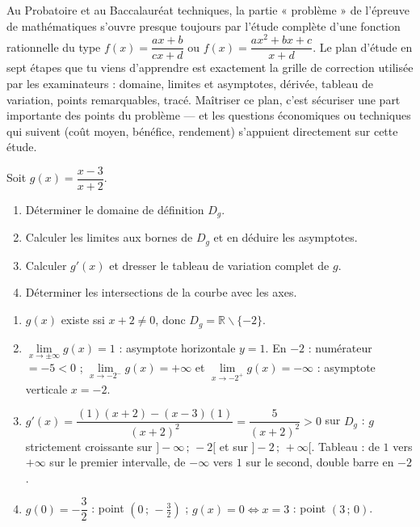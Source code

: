 \documentclass[11pt]{article}
\def\setminus{\mathbin{\backslash}}\let\smallsetminus\setminus
\begin{document}
\begin{savaistu}
Au Probatoire et au Baccalauréat techniques, la partie « problème » de l'épreuve de mathématiques s'ouvre presque toujours par l'étude complète d'une fonction rationnelle du type $f(x)=\dfrac{ax+b}{cx+d}$ ou $f(x)=\dfrac{ax^2+bx+c}{x+d}$. Le plan d'étude en sept étapes que tu viens d'apprendre est exactement la grille de correction utilisée par les examinateurs : domaine, limites et asymptotes, dérivée, tableau de variation, points remarquables, tracé. Maîtriser ce plan, c'est sécuriser une part importante des points du problème — et les questions économiques ou techniques qui suivent (coût moyen, bénéfice, rendement) s'appuient directement sur cette étude.
\end{savaistu}

\begin{exercice}
Soit $g(x)=\dfrac{x-3}{x+2}$.
\begin{enumerate}
\item Déterminer le domaine de définition $D_g$.
\item Calculer les limites aux bornes de $D_g$ et en déduire les asymptotes.
\item Calculer $g'(x)$ et dresser le tableau de variation complet de $g$.
\item Déterminer les intersections de la courbe avec les axes.
\end{enumerate}
\end{exercice}

\begin{corrige}[Exercice]
\begin{enumerate}
\item $g(x)$ existe ssi $x+2\neq 0$, donc $D_g=\mathbb{R}\setminus\{-2\}$.
\item $\lim\limits_{x\to\pm\infty}g(x)=1$ : asymptote horizontale $y=1$. En $-2$ : numérateur $=-5<0$ ; $\lim\limits_{x\to -2^{-}}g(x)=+\infty$ et $\lim\limits_{x\to -2^{+}}g(x)=-\infty$ : asymptote verticale $x=-2$.
\item $g'(x)=\dfrac{(1)(x+2)-(x-3)(1)}{(x+2)^2}=\dfrac{5}{(x+2)^2}>0$ sur $D_g$ : $g$ strictement croissante sur $]-\infty\,;\,-2[$ et sur $]-2\,;\,+\infty[$. Tableau : de $1$ vers $+\infty$ sur le premier intervalle, de $-\infty$ vers $1$ sur le second, double barre en $-2$.
\item $g(0)=-\dfrac{3}{2}$ : point $\left(0\,;\,-\tfrac{3}{2}\right)$ ; $g(x)=0\Leftrightarrow x=3$ : point $(3\,;\,0)$.
\end{enumerate}
\end{corrige}
\end{document}
